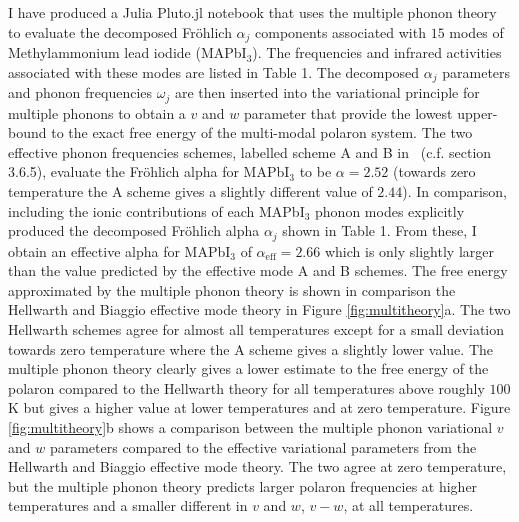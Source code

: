 I have produced a Julia Pluto.jl notebook that uses the multiple phonon theory to evaluate the decomposed Fr\"ohlich $\alpha_j$ components associated with $15$ modes of Methylammonium lead iodide (MAPbI$_3$). The frequencies and infrared activities associated with these modes are listed in Table 1. The decomposed $\alpha_j$ parameters and phonon frequencies $\omega_j$ are then inserted into the variational principle for multiple phonons to obtain a $v$ and $w$ parameter that provide the lowest upper-bound to the exact free energy of the multi-modal polaron system. The two effective phonon frequencies schemes, labelled scheme A and B in~\cite{hellwarth_mobility_1999} (c.f. section 3.6.5), evaluate the Fr\"ohlich alpha for MAPbI$_3$ to be $\alpha = 2.52$ (towards zero temperature the A scheme gives a slightly different value of $2.44$). In comparison, including the ionic contributions of each MAPbI$_3$ phonon modes explicitly produced the decomposed Fr\"ohlich alpha $\alpha_j$ shown in Table 1. From these, I obtain an effective alpha for MAPbI$_3$ of $\alpha_{\text{eff}} = 2.66$ which is only slightly larger than the value predicted by the effective mode A and B schemes. The free energy approximated by the multiple phonon theory is shown in comparison the Hellwarth and Biaggio effective mode theory in Figure \ref{fig:multitheory}a. The two Hellwarth schemes agree for almost all temperatures except for a small deviation towards zero temperature where the A scheme gives a slightly lower value. The multiple phonon theory clearly gives a lower estimate to the free energy of the polaron compared to the Hellwarth theory for all temperatures above roughly $100$K but gives a higher value at lower temperatures and at zero temperature. Figure \ref{fig:multitheory}b shows a comparison between the multiple phonon variational $v$ and $w$ parameters compared to the effective variational parameters from the Hellwarth and Biaggio effective mode theory. The two agree at zero temperature, but the multiple phonon theory predicts larger polaron frequencies at higher temperatures and a smaller different in $v$ and $w$, $v - w$, at all temperatures. 

